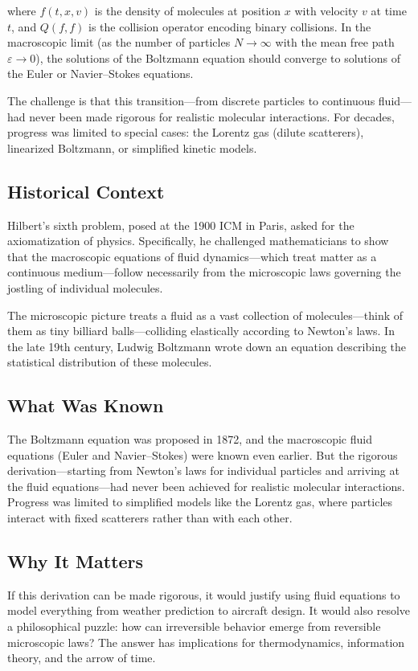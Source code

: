 where $f(t, x, v)$ is the density of molecules at position $x$ with velocity $v$ at time $t$, and $Q(f,f)$ is the collision operator encoding binary collisions. In the macroscopic limit (as the number of particles $N \to \infty$ with the mean free path $\varepsilon \to 0$), the solutions of the Boltzmann equation should converge to solutions of the Euler or Navier--Stokes equations.

The challenge is that this transition---from discrete particles to continuous fluid---had never been made rigorous for realistic molecular interactions. For decades, progress was limited to special cases: the Lorentz gas (dilute scatterers), linearized Boltzmann, or simplified kinetic models.

\subsection{Historical Context}
Hilbert's sixth problem, posed at the 1900 ICM in Paris, asked for the axiomatization of physics. Specifically, he challenged mathematicians to show that the macroscopic equations of fluid dynamics---which treat matter as a continuous medium---follow necessarily from the microscopic laws governing the jostling of individual molecules.

The microscopic picture treats a fluid as a vast collection of molecules---think of them as tiny billiard balls---colliding elastically according to Newton's laws. In the late 19th century, Ludwig Boltzmann wrote down an equation describing the statistical distribution of these molecules.

\subsection{What Was Known}
The Boltzmann equation was proposed in 1872, and the macroscopic fluid equations (Euler and Navier--Stokes) were known even earlier. But the rigorous derivation---starting from Newton's laws for individual particles and arriving at the fluid equations---had never been achieved for realistic molecular interactions. Progress was limited to simplified models like the Lorentz gas, where particles interact with fixed scatterers rather than with each other.

\subsection{Why It Matters}
If this derivation can be made rigorous, it would justify using fluid equations to model everything from weather prediction to aircraft design. It would also resolve a philosophical puzzle: how can irreversible behavior emerge from reversible microscopic laws? The answer has implications for thermodynamics, information theory, and the arrow of time.

